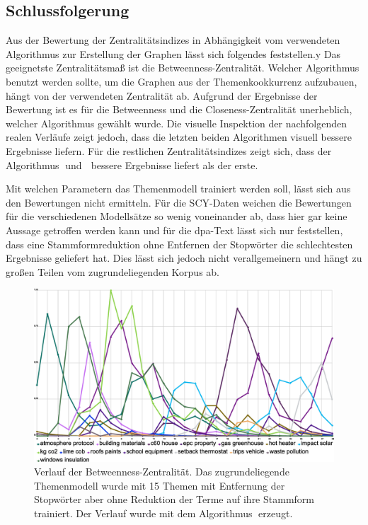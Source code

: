 \subsection{Schlussfolgerung}
Aus der Bewertung der Zentralitätsindizes in Abhängigkeit vom verwendeten Algorithmus zur Erstellung der Graphen lässt sich folgendes feststellen.y Das geeignetste Zentralitätsmaß ist die Betweenness-Zentralität. Welcher Algorithmus benutzt werden sollte, um die Graphen aus der Themenkookkurrenz aufzubauen, hängt von der verwendeten Zentralität ab. Aufgrund der Ergebnisse der Bewertung ist es für die Betweenness und die Closeness-Zentralität unerheblich, welcher Algorithmus gewählt wurde. Die visuelle Inspektion der nachfolgenden realen Verläufe zeigt jedoch, dass die letzten beiden Algorithmen visuell bessere Ergebnisse liefern. Für die restlichen Zentralitätsindizes zeigt sich, dass der Algorithmus \CDC$\;$und \TPR$\;$ bessere Ergebnisse liefert als der erste. 

Mit welchen Parametern das Themenmodell trainiert werden soll, lässt sich aus den Bewertungen nicht ermitteln. Für die SCY-Daten weichen die Bewertungen für die verschiedenen Modellsätze so wenig voneinander ab, dass hier gar keine Aussage getroffen werden kann und für die dpa-Text lässt sich nur feststellen, dass eine Stammformreduktion ohne Entfernen der Stopwörter die schlechtesten Ergebnisse geliefert hat. Dies lässt sich jedoch nicht verallgemeinern und hängt zu großen Teilen vom zugrundeliegenden Korpus ab. 

\begin{figure}[ht]
\includegraphics[width=\textwidth, height=0.45\textheight]{images/content/06_results/runs/co2_f7i2_15nostem_tpr_betweenness.eps} 
\caption{Verlauf der Betweenness-Zentralität. Das zugrundeliegende Themenmodell wurde mit 15 Themen mit Entfernung der Stopwörter aber ohne Reduktion der Terme auf ihre Stammform trainiert. Der Verlauf wurde mit dem Algorithmus \TPR$\;$erzeugt.}
\label{fig:co2_f7i2_15stem_tpr_betweeness}
\end{figure}

